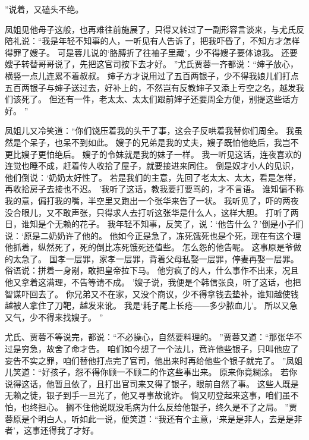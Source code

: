 ”说着，又磕头不绝。
\par
凤姐见他母子这般，也再难往前施展了，只得又转过了一副形容言谈来，与尤氏反陪礼说：“我是年轻不知事的人，一听见有人告诉了，把我吓昏了，不知方才怎样得罪了嫂子。
可是蓉儿说的‘胳膊折了往袖子里藏’，少不得嫂子要体谅我。
还要嫂子转替哥哥说了，先把这官司按下去才好。
”尤氏贾蓉一齐都说：“婶子放心，横竖一点儿连累不着叔叔。
婶子方才说用过了五百两银子，少不得我娘儿们打点五百两银子与婶子送过去，好补上的，不然岂有反教婶子又添上亏空之名，越发我们该死了。
但还有一件，老太太、太太们跟前婶子还要周全方便，别提这些话方好。
”\par
凤姐儿又冷笑道：“你们饶压着我的头干了事，这会子反哄着我替你们周全。
我虽然是个呆子，也呆不到如此。
嫂子的兄弟是我的丈夫，嫂子既怕他绝后，我岂不更比嫂子更怕绝后。
嫂子的令妹就是我的妹子一样。
我一听见这话，连夜喜欢的连觉也睡不成，赶着传人收拾了屋子，就要接进来同住。
倒是奴才小人的见识，他们倒说：‘奶奶太好性了。
若是我们的主意，先回了老太太、太太，看是怎样，再收拾房子去接也不迟。
’我听了这话，教我要打要骂的，才不言语。
谁知偏不称我的意，偏打我的嘴，半空里又跑出一个张华来告了一状。
我听见了，吓的两夜没合眼儿，又不敢声张，只得求人去打听这张华是什么人，这样大胆。
打听了两日，谁知是个无赖的花子。
我年轻不知事，反笑了，说：‘他告什么？’倒是小子们说：‘原是二奶奶许了他的。
他如今正是急了，冻死饿死也是个死，现在有这个理他抓着，纵然死了，死的倒比冻死饿死还值些。
怎么怨的他告呢。
这事原是爷做的太急了。
国孝一层罪，家孝一层罪，背着父母私娶一层罪，停妻再娶一层罪。
俗语说：拼着一身剐，敢把皇帝拉下马。
他穷疯了的人，什么事作不出来，况且他又拿着这满理，不告等请不成。
’嫂子说，我便是个韩信张良，听了这话，也把智谋吓回去了。
你兄弟又不在家，又没个商议，少不得拿钱去垫补，谁知越使钱越被人拿住了刀靶，越发来讹。
我是‘耗子尾上长疮——多少脓血儿’。
所以又急又气，少不得来找嫂子。
”\par
尤氏、贾蓉不等说完，都说：“不必操心，自然要料理的。
”贾蓉又道：“那张华不过是穷急，故舍了命才告。
咱们如今想了一个法儿，竟许他些银子，只叫他应了妄告不实之罪，咱们替他打点完了官司，他出来时再给他些个银子就完了。
”凤姐儿笑道：“好孩子，怨不得你顾一不顾二的作这些事出来。
原来你竟糊涂。
若你说得这话，他暂且依了，且打出官司来又得了银子，眼前自然了事。
这些人既是无赖之徒，银子到手一旦光了，他又寻事故讹诈。
倘又叨登起来这事，咱们虽不怕，也终担心。
搁不住他说既没毛病为什么反给他银子，终久是不了之局。
”贾蓉原是个明白人，听如此一说，便笑道：“我还有个主意，‘来是是非人，去是是非者’，这事还得我了才好。
